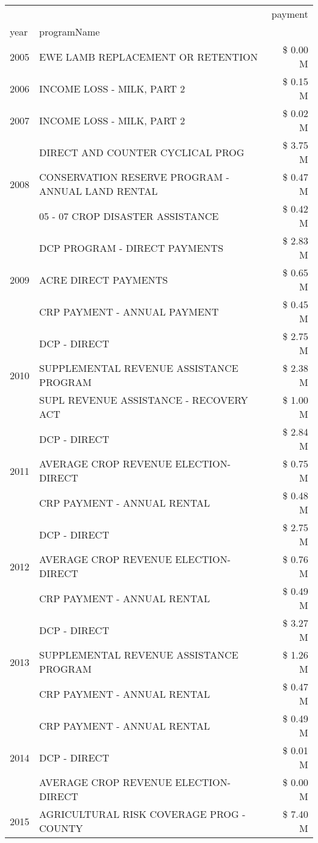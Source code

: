 \begin{tabular}{llr}
\toprule
 &  & payment \\
year & programName &  \\
\midrule
2005 & EWE LAMB REPLACEMENT OR RETENTION & \$ 0.00 M \\
\cline{1-3}
2006 & INCOME LOSS - MILK, PART 2 & \$ 0.15 M \\
\cline{1-3}
2007 & INCOME LOSS - MILK, PART 2 & \$ 0.02 M \\
\cline{1-3}
\multirow[t]{3}{*}{2008} & DIRECT AND COUNTER CYCLICAL PROG & \$ 3.75 M \\
 & CONSERVATION RESERVE PROGRAM - ANNUAL LAND RENTAL & \$ 0.47 M \\
 & 05 - 07 CROP DISASTER ASSISTANCE & \$ 0.42 M \\
\cline{1-3}
\multirow[t]{3}{*}{2009} & DCP PROGRAM - DIRECT PAYMENTS & \$ 2.83 M \\
 & ACRE DIRECT PAYMENTS & \$ 0.65 M \\
 & CRP PAYMENT - ANNUAL PAYMENT & \$ 0.45 M \\
\cline{1-3}
\multirow[t]{3}{*}{2010} & DCP - DIRECT & \$ 2.75 M \\
 & SUPPLEMENTAL REVENUE ASSISTANCE PROGRAM & \$ 2.38 M \\
 & SUPL REVENUE ASSISTANCE - RECOVERY ACT & \$ 1.00 M \\
\cline{1-3}
\multirow[t]{3}{*}{2011} & DCP - DIRECT & \$ 2.84 M \\
 & AVERAGE CROP REVENUE ELECTION-DIRECT & \$ 0.75 M \\
 & CRP PAYMENT - ANNUAL RENTAL & \$ 0.48 M \\
\cline{1-3}
\multirow[t]{3}{*}{2012} & DCP - DIRECT & \$ 2.75 M \\
 & AVERAGE CROP REVENUE ELECTION-DIRECT & \$ 0.76 M \\
 & CRP PAYMENT - ANNUAL RENTAL & \$ 0.49 M \\
\cline{1-3}
\multirow[t]{3}{*}{2013} & DCP - DIRECT & \$ 3.27 M \\
 & SUPPLEMENTAL REVENUE ASSISTANCE PROGRAM & \$ 1.26 M \\
 & CRP PAYMENT - ANNUAL RENTAL & \$ 0.47 M \\
\cline{1-3}
\multirow[t]{3}{*}{2014} & CRP PAYMENT - ANNUAL RENTAL & \$ 0.49 M \\
 & DCP - DIRECT & \$ 0.01 M \\
 & AVERAGE CROP REVENUE ELECTION-DIRECT & \$ 0.00 M \\
\cline{1-3}
\multirow[t]{2}{*}{2015} & AGRICULTURAL RISK COVERAGE PROG - COUNTY & \$ 7.40 M \\

\end{tabular}
